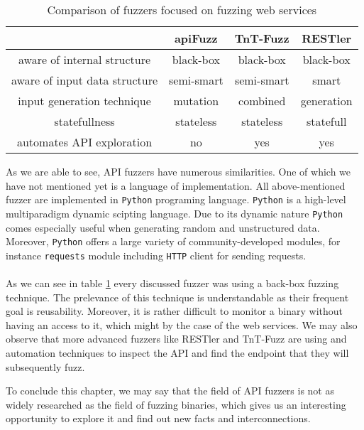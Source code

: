 \begin{table}
\begin{center}
\begin{tabular}{|c|c c c|}
\hline
                              & apiFuzz    & TnT-Fuzz   & RESTler    \\
\hline
aware of internal structure   & black-box  & black-box  & black-box  \\
aware of input data structure & semi-smart & semi-smart & smart      \\
input generation technique    & mutation   & combined   & generation \\
statefullness                 & stateless  & stateless  & statefull  \\
automates API exploration     & no         & yes        & yes        \\
\hline
\end{tabular}
\caption{Comparison of fuzzers focused on fuzzing web services}
\label{table:fuzzers-comparison}
\end{center}
\end{table}

As we are able to see, API fuzzers have numerous similarities. One of which we have not mentioned yet is a language of implementation. All above-mentioned fuzzer are implemented in \texttt{Python} programing language. \texttt{Python} is a high-level multiparadigm dynamic scipting language. Due to its dynamic nature \texttt{Python} comes especially useful when generating random and unstructured data. Moreover, \texttt{Python} offers a large variety of community-developed modules, for instance \texttt{requests} module including \texttt{HTTP} client for sending requests.

\paragraph{}
As we can see in table \ref{table:fuzzers-comparison} every discussed fuzzer was using a back-box fuzzing technique. The prelevance of this technique is understandable as their frequent goal is reusability. Moreover, it is rather difficult to monitor a binary without having an access to it, which might by the case of the web services. We may also observe that more advanced fuzzers like RESTler and TnT-Fuzz are using and automation techniques to inspect the API and find the endpoint that they will subsequently fuzz.

To conclude this chapter, we may say that the field of API fuzzers is not as widely researched as the field of fuzzing binaries, which gives us an interesting opportunity to explore it and find out new facts and interconnections.
